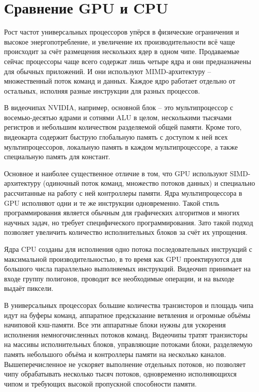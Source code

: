 \documentclass[a4paper,14pt,russian]{extreport}
\begin{document}
\section{Сравнение GPU и CPU} 
\cite{poletaev} Рост частот универсальных процессоров упёрся в физические ограничения и высокое энергопотребление, и увеличение их производительности всё чаще происходит за счёт размещения нескольких ядер в одном чипе. Продаваемые сейчас процессоры чаще всего содержат лишь четыре ядра и они предназначены для обычных приложений. И они используют MIMD-архитектуру – множественный поток команд и данных. Каждое ядро работает отдельно от остальных, исполняя разные инструкции для разных процессов. 
\par
В видеочипах NVIDIA, например, основной блок – это мультипроцессор с восемью-десятью ядрами и сотнями ALU в целом, несколькими тысячами регистров и небольшим количеством разделяемой общей памяти. Кроме того, видеокарта содержит быструю глобальную память с доступом к ней всех мультипроцессоров, локальную память в каждом мультипроцессоре, а также специальную память для констант.
\par
Основное и наиболее существенное отличие в том, что GPU используют SIMD-архитектуру (одиночный поток команд, множество потоков данных) и специально рассчитанные на работу с ней контроллеры памяти. Ядра мультипроцессора в GPU исполняют одни и те же инструкции одновременно. Такой стиль программирования является обычным для графических алгоритмов и многих научных задач, но требует специфического программирования. Зато такой подход позволяет увеличить количество исполнительных блоков за счёт их упрощения. 
\par
Ядра CPU созданы для исполнения одно потока последовательных инструкций с максимальной производительностью, в то время как GPU проектируются для большого числа параллельно выполняемых инструкций. Видеочип принимает на входе группу полигонов, проводит все необходимые операции, и на выходе выдаёт пиксели.
\par
В универсальных процессорах большие количества транзисторов и площадь чипа идут на буферы команд, аппаратное предсказание ветвления и огромные объёмы начиповой кэш-памяти. Все эти аппаратные блоки нужны для ускорения исполнения немногочисленных потоков команд. Видеочипы тратят транзисторы на массивы исполнительных блоков, управляющие потоками блоки, разделяемую память небольшого объёма и контроллеры памяти на несколько каналов. Вышеперечисленное не ускоряет выполнение отдельных потоков, но позволяет чипу обрабатывать несколько тысяч потоков, одновременно исполняющихся чипом и требующих высокой пропускной способности памяти.
\end{document}
